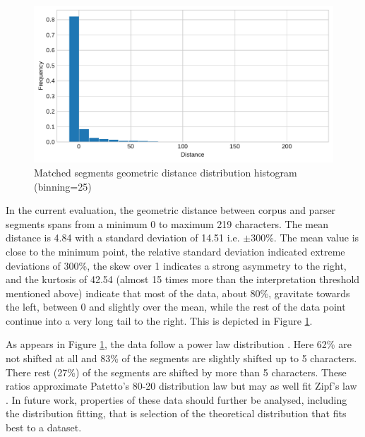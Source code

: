     \begin{figure}[!ht]
    \centering
    \includegraphics[width=.85\textwidth]{evaluation-results/figures/distance-distribution-histogram-Geometric-25.pdf}
    \caption{Matched segments geometric distance distribution histogram (binning=25)}
    \label{fig:distance-distribution-histogram-Geometric-25}
    \end{figure}

    In the current evaluation, the geometric distance between corpus and parser segments spans from a minimum 0 to maximum 219 characters. The mean distance is 4.84 with a standard deviation of 14.51 i.e. $\pm$300\%. The mean value is close to the minimum point, the relative standard deviation indicated extreme deviations of 300\%, the skew over 1 indicates a strong asymmetry to the right, and the kurtosis of 42.54 (almost 15 times more than the interpretation threshold mentioned above) indicate that most of the data, about 80\%, gravitate towards the left, between 0 and slightly over the mean, while the rest of the data point continue into a very long tail to the right. This is depicted in Figure \ref{fig:distance-distribution-histogram-Geometric-25}. 
    
    As appears in Figure \ref{fig:distance-distribution-histogram-Geometric-25}, the data follow a power law distribution \citep{newman2005power}. Here 62\% are not shifted at all and 83\% of the segments are slightly shifted up to 5 characters. There rest (27\%) of the segments are shifted by more than 5 characters. These ratios approximate Patetto's 80-20 distribution law but may as well fit Zipf's law \citep{newman2005power}. In future work, properties of these data should further be analysed, including the distribution fitting, that is selection of the theoretical distribution that fits best to a dataset.
    
